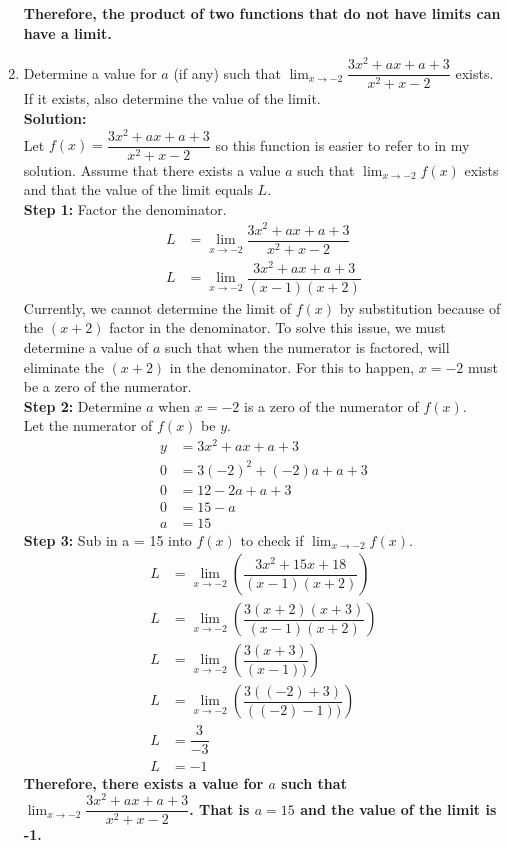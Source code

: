 \documentclass[12pt]{book}
\begin{document}
\begin{enumerate}
\textbf{Therefore, the product of two functions that do not have limits can have a limit.}

\newpage

\item Determine a value for $a$ (if any) such that $\lim_{x\to -2}\limits \dfrac{3x^2 + ax + a + 3}{x^2 + x - 2}$ exists. If it exists, also determine the value of the limit. \\

\textbf{Solution:} \\
Let $f(x) = \dfrac{3x^2 + ax + a + 3}{x^2 + x - 2}$ so this function is easier to refer to in my solution.
Assume that there exists a value $a$ such that $\lim_{x\to -2}\limits f(x)$ exists and that the value of the limit equals $L$. \\

\textbf{Step 1:} Factor the denominator.
\begin{align}
    L &= \lim_{x\to -2}\limits \dfrac{3x^2 + ax + a + 3}{x^2 + x - 2} \\
    L &= \lim_{x\to -2}\limits \dfrac{3x^2 + ax + a + 3}{(x-1)(x+2)}
\end{align}
Currently, we cannot determine the limit of $f(x)$ by substitution because of the $(x+2)$ factor in the denominator. To solve this issue, we must determine a value of $a$ such that when the numerator is factored, will eliminate the $(x+2)$ in the denominator. For this to happen, $x=-2$ must be a zero of the numerator. \\

\textbf{Step 2:} Determine $a$ when $x=-2$ is a zero of the numerator of $f(x)$.\\
Let the numerator of $f(x)$ be $y$.
\begin{align}
    y &= 3x^2 + ax + a + 3 \\
    0 &= 3(-2)^2 + (-2)a + a + 3 \\
    0 &= 12 - 2a + a + 3 \\
    0 &= 15 - a \\
    a &= 15
\end{align}
\textbf{Step 3:} Sub in a = 15 into $f(x)$ to check if $\lim_{x\to -2}\limits f(x)$.
\begin{align}
    L &= \lim_{x\to -2}\limits \left(\dfrac{3x^2+15x+18}{(x-1)(x+2)} \right) \\
    L &= \lim_{x\to -2}\limits \left(\dfrac{3(x+2)(x+3)}{(x-1)(x+2)} \right) \\
    L &= \lim_{x\to -2}\limits \left(\dfrac{3(x+3)}{(x-1))} \right) \\
    L &= \lim_{x\to -2}\limits \left(\dfrac{3((-2)+3)}{((-2)-1))} \right) \\
    L &= \dfrac{3}{-3} \\
    L &= -1
\end{align}
\textbf{Therefore, there exists a value for $a$ such that $\lim_{x\to -2}\limits \dfrac{3x^2 + ax + a + 3}{x^2 + x - 2}$. That is $a = 15$ and the value of the limit is -1.}



\end{enumerate}
\end{document}

